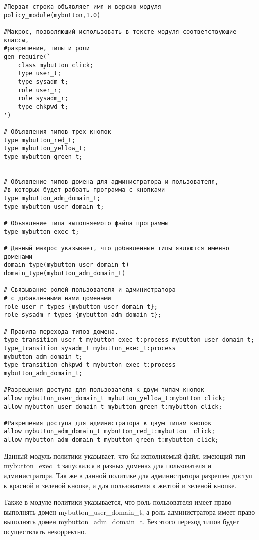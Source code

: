 \documentclass{./../class/UIR}
\begin{document}
\begin{verbatim}
#Первая строка объявляет имя и версию модуля
policy_module(mybutton,1.0)

#Макрос, позволяющий использовать в тексте модуля соответствующие классы,
#разрешение, типы и роли
gen_require(`
    class mybutton click;
    type user_t;
    type sysadm_t;
    role user_r;	
    role sysadm_r;
    type chkpwd_t;
')

# Объявления типов трех кнопок
type mybutton_red_t;
type mybutton_yellow_t;
type mybutton_green_t;


# Объявление типов домена для администратора и пользователя,
#в которых будет рабоать программа с кнопками
type mybutton_adm_domain_t;
type mybutton_user_domain_t;

# Объявление типа выполняемого файла программы
type mybutton_exec_t;

# Данный макрос указывает, что добавленные типы являются именно доменами
domain_type(mybutton_user_domain_t)
domain_type(mybutton_adm_domain_t)

# Связывание ролей пользователя и администратора
# с добавленными нами доменами
role user_r types {mybutton_user_domain_t};
role sysadm_r types {mybutton_adm_domain_t};

# Правила перехода типов домена.
type_transition user_t mybutton_exec_t:process mybutton_user_domain_t;
type_transition sysadm_t mybutton_exec_t:process mybutton_adm_domain_t;
type_transition chkpwd_t mybutton_exec_t:process mybutton_adm_domain_t;

#Разрешения доступа для пользователя к двум типам кнопок
allow mybutton_user_domain_t mybutton_yellow_t:mybutton click;
allow mybutton_user_domain_t mybutton_green_t:mybutton click;

#Разрешения доступа для администратора к двум типам кнопок
allow mybutton_adm_domain_t mybutton_red_t:mybutton  click;
allow mybutton_adm_domain_t mybutton_green_t:mybutton click;

\end{verbatim}
	Данный модуль политики указывает, что бы исполняемый файл, имеющий тип
	mybutton\_exec\_t запускался в разных доменах для пользователя и
	администратора. Так же в данной политике для администратора разрешен доступ к
	красной и зеленой кнопке, а для пользователя к желтой и зеленой кнопке.
	
	Также в модуле политики указывается, что роль пользователя имеет право выполнять
	домен mybutton\_user\_domain\_t, а роль администратора имеет право выполнять
	домен mybutton\_adm\_domain\_t. Без этого переход типов будет осуществлять
	некорректно.
	
\end{document}
